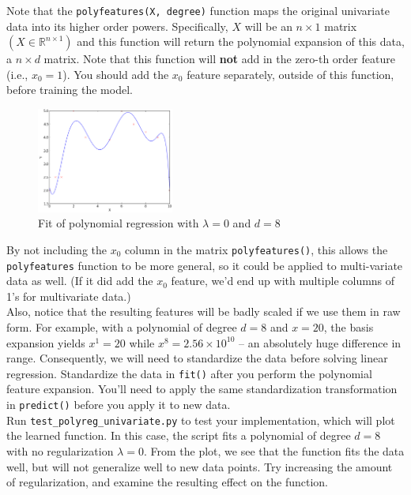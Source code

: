 Note that the \texttt{polyfeatures(X, degree)} function maps the original univariate data into its higher order powers.  Specifically, $X$ will be an $n \times 1$ matrix $(X \in \mathbb{R}^{n \times 1})$ and this function will return the polynomial expansion of this data, a $n \times d$ matrix.  Note that this function will {\bf not} add in the zero-th order feature (i.e., $x_0 = 1$).  You should add the $x_0$ feature separately, outside of this function, before training the model.
\begin{figure}
  \centering
  \vspace{-1em}
  \includegraphics[width=0.4\textwidth]{images/polyregDegree8.png}
    \vspace{-1em}
  \caption{Fit of polynomial regression with $\lambda = 0$ and $d = 8$}\label{fig:polyregUnivariate}
  \vspace{-2em}
\end{figure}
By not including the $x_0$ column in the matrix \texttt{polyfeatures()}, this allows the \texttt{polyfeatures} function to be more general, so it could be applied to multi-variate data as well. (If it did add the $x_0$ feature, we'd end up with multiple columns of 1's for multivariate data.)\\

Also, notice that the resulting features will be badly scaled if we use them in raw form.  For example, with a polynomial of degree $d = 8$ and $x = 20$, the basis expansion yields $x^1 = 20$ while $x^8 = 2.56 \times 10^{10}$ -- an
absolutely huge difference in range.  Consequently, we will need to standardize the data before solving linear regression.  Standardize the data in \texttt{fit()} after you perform the polynomial feature expansion.  You'll need to apply the same standardization transformation in \texttt{predict()} before you apply it to new data.\\

 Run \texttt{test\_polyreg\_univariate.py} to test your implementation, which will plot the learned function.  In this case, the script fits a polynomial of degree $d=8$ with no regularization $\lambda = 0$.  From the plot, we see that the function fits the data well, but will not generalize well to new data points.  Try increasing the amount of regularization, and examine the resulting effect on the function.\\


